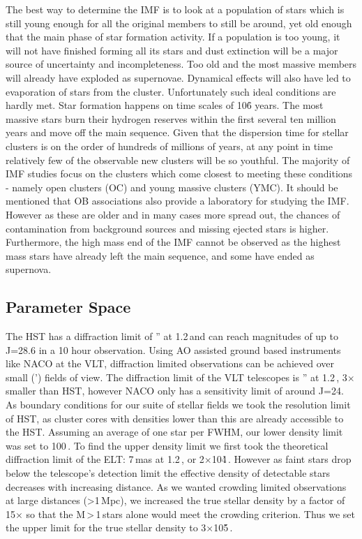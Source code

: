 The best way to determine the IMF is to look at a population of stars which is still young enough for all the original members to still be around, yet old enough that the main phase of star formation activity. If a population is too young, it will not have finished forming all its stars and dust extinction will be a major source of uncertainty and incompleteness. Too old and the most massive members will already have exploded as supernovae. Dynamical effects will also have led to evaporation of stars from the cluster.  Unfortunately such ideal conditions are hardly met. Star formation happens on time scales of 10\h6 years. The most massive stars burn their hydrogen reserves within the first several ten million years and move off the main sequence. Given that the dispersion time for stellar clusters is on the order of hundreds of millions of years, at any point in time relatively few of the observable new clusters will be so youthful. The majority of IMF studies focus on the clusters which come closest to meeting these conditions - namely open clusters (OC) and young massive clusters (YMC). It should be mentioned that OB associations also provide a laboratory for studying the IMF. However as these are older and in many cases more spread out, the chances of contamination from background sources and missing ejected stars is higher. Furthermore, the high mass end of the IMF cannot be observed as the highest mass stars have already left the main sequence, and some have ended as supernova.


\subsection{Parameter Space}

The HST has a diffraction limit of '' at 1.2\,\um and can reach magnitudes of up to J=28.6\m \citep{hst_wfc3} in a 10 hour observation. Using AO assisted ground based instruments like NACO at the VLT, diffraction limited observations can be achieved over small (') fields of view. The diffraction limit of the VLT telescopes is '' at 1.2\,\um, 3$\times$ smaller than HST, however NACO only has a sensitivity limit of around J=24\m. As boundary conditions for our suite of stellar fields we took the resolution limit of HST, as cluster cores with densities lower than this are already accessible to the HST. Assuming an average of one star per FWHM, our lower density limit was set to 100\,\spa. To find the upper density limit we first took the theoretical diffraction limit of the ELT: 7\,mas at 1.2\,\ume, or 2$\times$10\h4\,\spa. However as faint stars drop below the telescope's detection limit the effective density of detectable stars decreases with increasing distance. As we wanted crowding limited observations at large distances (\textgreater1\,Mpc), we increased the true stellar density by a factor of 15$\times$ so that the M\,\textgreater\,1\,\msun stars alone would meet the crowding criterion. Thus we set the upper limit for the true stellar density to 3$\times$10\h5\,\spa.

